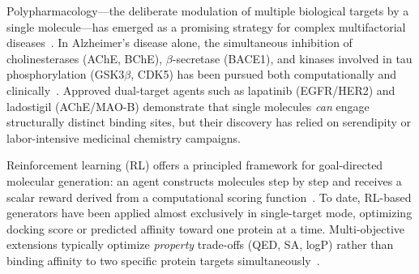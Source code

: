 
Polypharmacology---the deliberate modulation of multiple biological
targets by a single molecule---has emerged as a promising strategy for
complex multifactorial diseases~\citep{bolognesi2013polypharmacology,
anighoro2014polypharmacology}.
In Alzheimer's disease alone, the simultaneous inhibition of
cholinesterases (AChE, BChE), $\beta$-secretase (BACE1), and kinases
involved in tau phosphorylation (GSK3$\beta$, CDK5) has been pursued
both computationally and
clinically~\citep{stern2022multitarget, weinreb2012cholinesterase}.
Approved dual-target agents such as lapatinib (EGFR/HER2) and
ladostigil (AChE/MAO-B) demonstrate that single molecules \emph{can}
engage structurally distinct binding sites, but their discovery has
relied on serendipity or labor-intensive medicinal chemistry campaigns.

Reinforcement learning (RL) offers a principled framework for
goal-directed molecular generation: an agent constructs molecules
step by step and receives a scalar reward derived from a computational
scoring function~\citep{telepov2023freedpp, loeffler2024reinvent4}.
To date, RL-based generators have been applied almost exclusively
in single-target mode, optimizing docking score or predicted affinity
toward one protein at a time.
Multi-objective extensions typically optimize \emph{property}
trade-offs (QED, SA, logP) rather than binding affinity to two
specific protein targets
simultaneously~\citep{fromer2023moo, wang2024scarlp}.

